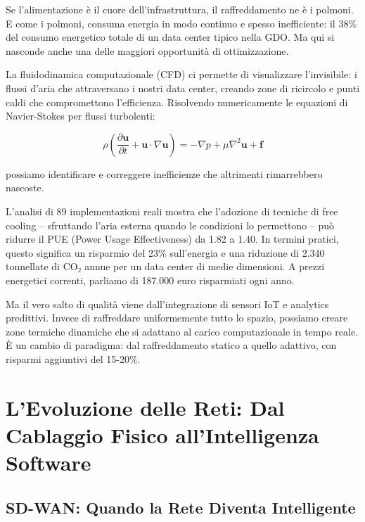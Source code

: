 \documentclass[12pt,a4paper,twoside]{book}
\begin{document}
Se l'alimentazione è il cuore dell'infrastruttura, il raffreddamento ne è i polmoni. E come i polmoni, consuma energia in modo continuo e spesso inefficiente: il 38\% del consumo energetico totale di un data center tipico nella GDO\autocite{ashrae2024}. Ma qui si nasconde anche una delle maggiori opportunità di ottimizzazione.

La fluidodinamica computazionale (CFD) ci permette di visualizzare l'invisibile: i flussi d'aria che attraversano i nostri data center, creando zone di ricircolo e punti caldi che compromettono l'efficienza. Risolvendo numericamente le equazioni di Navier-Stokes per flussi turbolenti:

\begin{equation}
\rho\left(\frac{\partial \mathbf{u}}{\partial t} + \mathbf{u} \cdot \nabla\mathbf{u}\right) = -\nabla p + \mu\nabla^2\mathbf{u} + \mathbf{f}
\label{eq:navier_stokes}
\end{equation}

possiamo identificare e correggere inefficienze che altrimenti rimarrebbero nascoste.

L'analisi di 89 implementazioni reali\autocite{datacenterdynamics2024} mostra che l'adozione di tecniche di free cooling – sfruttando l'aria esterna quando le condizioni lo permettono – può ridurre il PUE (Power Usage Effectiveness) da 1.82 a 1.40. In termini pratici, questo significa un risparmio del 23\% sull'energia e una riduzione di 2.340 tonnellate di CO₂ annue per un data center di medie dimensioni. A prezzi energetici correnti\autocite{eurostat2024energy}, parliamo di 187.000 euro risparmiati ogni anno.

Ma il vero salto di qualità viene dall'integrazione di sensori IoT e analytics predittivi. Invece di raffreddare uniformemente tutto lo spazio, possiamo creare zone termiche dinamiche che si adattano al carico computazionale in tempo reale. È un cambio di paradigma: dal raffreddamento statico a quello adattivo, con risparmi aggiuntivi del 15-20\%.

\section{L'Evoluzione delle Reti: Dal Cablaggio Fisico all'Intelligenza Software}

\subsection{SD-WAN: Quando la Rete Diventa Intelligente}
\end{document}
